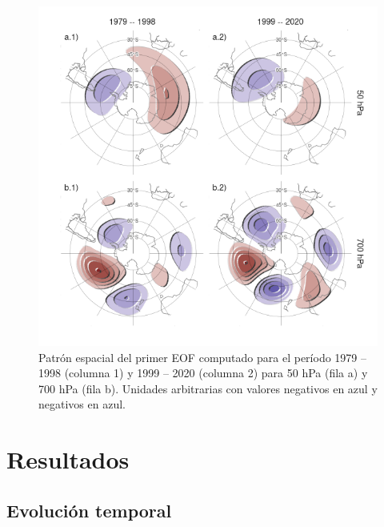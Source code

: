 \documentclass[12pt,oneside,a4paper]{reedthesis}
\begin{document}
\begin{figure}

{\centering \includegraphics{figures/30-sam/sam-period-1} 

}

\caption{Patrón espacial del primer EOF computado para el período 1979 -- 1998 (columna 1) y 1999 -- 2020 (columna 2) para 50 hPa (fila a) y 700 hPa (fila b). Unidades arbitrarias con valores negativos en azul y negativos en azul.}\label{fig:sam-period}
\end{figure}

\hypertarget{resultados-2}{%
\section{Resultados}\label{resultados-2}}

\hypertarget{temporal}{%
\subsection{Evolución temporal}\label{temporal}}
\end{document}
